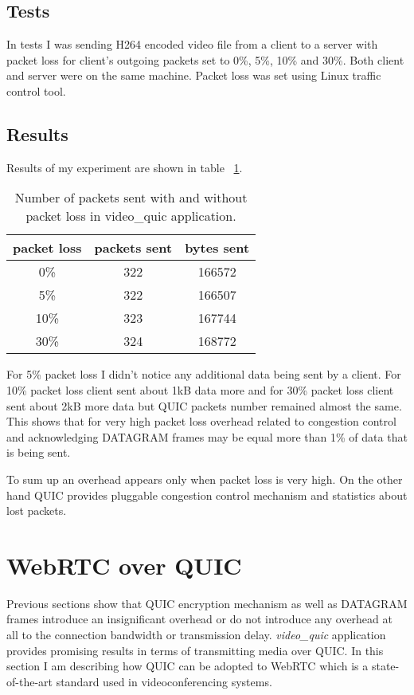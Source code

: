 \FloatBarrier

\subsection{Tests}
\label{subsec:tests}
In tests I was sending H264 encoded video file from a client to a server with packet loss for client's outgoing packets
set to 0\%, 5\%, 10\% and 30\%.
Both client and server were on the same machine.
Packet loss was set using Linux traffic control tool.

\subsection{Results}
\label{subsec:results3}
Results of my experiment are shown in table ~\ref{tab:video-quic-table}.

\begin{table}[h]
    \centering
    \begin{tabular}{ c | c | c }
        packet loss & packets sent & bytes sent \\
        \hline
        0\%         & 322          & 166572     \\
        5\%         & 322          & 166507     \\
        10\%        & 323          & 167744     \\
        30\%        & 324          & 168772     \\
    \end{tabular}
    \caption{\label{tab:video-quic-table}Number of packets sent with and without packet loss in video\_quic application.}
\end{table}
For 5\% packet loss I didn't notice any additional data being sent by a client.
For 10\% packet loss client sent about 1kB data more and for 30\% packet loss client sent about 2kB more data but
QUIC packets number remained almost the same.
This shows that for very high packet loss overhead related to congestion control and acknowledging DATAGRAM frames
may be equal more than 1\% of data that is being sent.

To sum up an overhead appears only when packet loss is very high.
On the other hand QUIC provides pluggable congestion control mechanism and statistics about lost packets.

\clearpage

\section{WebRTC over QUIC}
\label{sec:webrtc-over-quic}
Previous sections show that QUIC encryption mechanism as well as DATAGRAM frames introduce an insignificant overhead
or do not introduce any overhead at all to the connection bandwidth or transmission delay.
\textit{video\_quic} application provides promising results in terms of transmitting media over QUIC\@.
In this section I am describing how QUIC can be adopted to WebRTC which is a state-of-the-art standard
used in videoconferencing systems.

